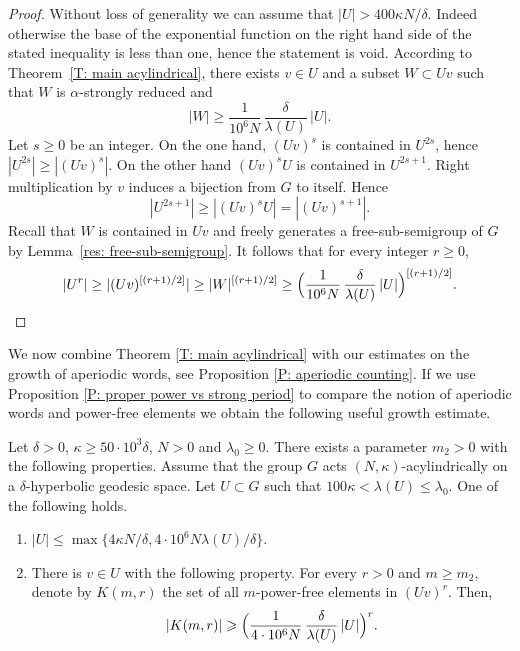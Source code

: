 \begin{proof}
Without loss of generality we can assume that $|U| > 400\kappa N /\delta$.
Indeed otherwise the base of the exponential function on the right hand side of the stated inequality is less than one, hence the statement is void.
According to Theorem~\ref{T: main acylindrical}, there exists $v \in U$ and a subset $W \subset Uv$ such that $W$ is $\alpha$-strongly reduced and
\begin{equation*}
|W| \geq \frac 1{10^6N}\,\frac \delta{\lambda(U)}\, |U|.
\end{equation*}
Let $s \geq 0$ be an integer.
On the one hand, $(Uv)^s$ is contained in $U^{2s}$, hence $|U^{2s}| \geq |(Uv)^s|$.
On the other hand $(Uv)^sU$ is contained in $U^{2s+1}$.
Right multiplication by $v$ induces a bijection from $G$ to itself.
Hence
\begin{equation*}
|U^{2s+1}| \geq |(Uv)^sU| = |(Uv)^{s+1}|.
\end{equation*}
Recall that $W$ is contained in $Uv$ and freely generates a free-sub-semigroup of $G$ by Lemma~\ref{res: free-sub-semigroup}.
It follows that for every integer $r \geq 0$,
\begin{equation*}
|U^r| \geq |(Uv)^{[(r+1)/2]}| \geq |W|^{[(r+1)/2]} \geq \Bigl( \frac 1{10^6N}\,\frac \delta{\lambda(U)}\, |U| \Bigr)^{[(r+1)/2]}.\qedhere
\end{equation*}
\end{proof}

We now combine Theorem \ref{T: main acylindrical} with our estimates on the growth of aperiodic words, see Proposition \ref{P: aperiodic counting}. If we use Proposition \ref{P: proper power vs strong period} to compare the notion of aperiodic words and power-free elements we obtain the following useful growth estimate.

\begin{cor}\label{T: main acylindrical power free}
Let $\delta >0$, $\kappa\geqslant 50\cdot 10^3\delta$, $N>0$ and $\lambda_0 \geq 0$.
There exists a parameter $m_2 > 0$ with the following properties.
Assume that the group $G$ acts $(N,\kappa)$-acylindrically on a $\delta$-hyperbolic geodesic space.
Let $U\subset G$ such that \hbox{$100\kappa \!<\!\lambda(U) \!\leq\! \lambda_0$}.
One of the following holds.
\begin{enumerate}
\item $\displaystyle |U| \leq \max\{4\kappa N/\delta, 4\cdot 10^6 N \lambda(U)/\delta\}$.
\item There is $v \in U$ with the following property.
For every $r > 0$ and $m \geq m_2$, denote by $K(m,r)$ the set of all $m$-power-free elements in $(Uv)^r$.
Then,
\[
|K(m,r)| \geqslant \Bigl( \frac{1}{4\cdot 10^6 N}\,\frac{\delta}{\lambda(U)}\, |U|\Bigr)^{r}. 
\]
\end{enumerate}

\end{cor}

